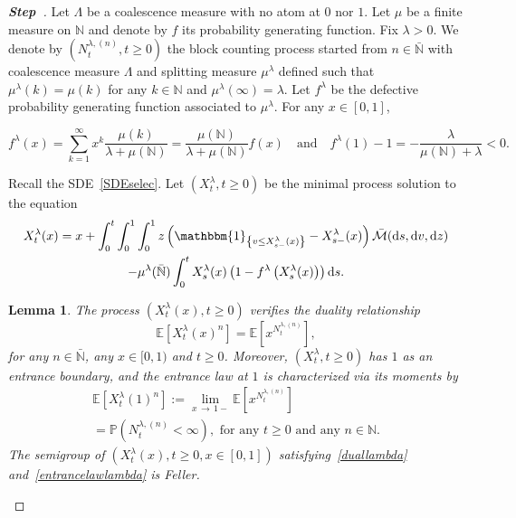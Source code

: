 \documentclass[10pt]{amsart}
\newtheorem{lemm}[theo]{Lemma}\newtheorem{prop}[theo]{Proposition}\newtheorem{coro}[theo]{Corollary}\newtheorem{conj}[theo]{Conjecture}
\theoremstyle{definition}\newtheorem{defi}[theo]{Definition}\newtheorem{rema}[theo]{Remark}\newtheorem{exam}[theo]{Example}\newtheorem{exem}[theo]{Example}\newtheorem{nota}[theo]{Notation}
\newcommand{\ddr}{\mathrm{d}}
\newcommand{\bbmun}{\mathbbm{1}}
\newcommand{\bbN}{\mathbb{N}}
\newcommand{\bbE}{\mathbb{E}}
\newcommand{\bbP}{\mathbb{P}}
\newcommand{\clM}{\mathcal{M}}
\newcounter{stepcount}
\newenvironment{step}{\refstepcounter{stepcount}\begin{proof}[\textbf{Step~\thestepcount}]}{\end{proof}}
\begin{document}
\begin{step}%
Let $\Lambda$ be a coalescence measure with no atom at $0$ nor $1$. Let $\mu$ be a finite measure on $\bbN$ and denote by $f$ its probability generating function. Fix $\lambda>0$. We denote by $(N_t^{\lambda,(n)},t\geq 0)$ the block counting process started from $n\in \bar{\bbN}$ with coalescence measure $\Lambda$ and splitting measure $\mu^{\lambda}$ defined such that $\mu^{\lambda}(k)=\mu(k)$ for any $k\in \bbN$ and $\mu^{\lambda}(\infty)=\lambda$. Let $f^{\lambda}$ be the defective probability generating function associated to $\mu^{\lambda}$. For any $x\in [0,1]$, 

\[
f^{\lambda}(x)=\sum_{k=1}^{\infty}x^{k}\frac{\mu(k)}{\lambda+\mu(\bbN)}=\frac{\mu(\bbN)}{\lambda+\mu(\bbN)}f(x)\quad\text{and}\quad f^{\lambda}(1)-1=-\frac{\lambda}{\mu(\bbN)+\lambda}<0.
\]

Recall the SDE~\eqref{SDEselec}. Let $(X^{\lambda}_t,t\geq 0)$ be the minimal process solution to the equation
\begin{multline}\label{sdelambda}
X^{\lambda}_t(x)=x+\int_{0}^{t}\int_{0}^{1}\int_{0}^{1}z\left(\bbmun_{\left\{v\leq X^{\lambda}_{s-}(x)\right\}}-X^{\lambda}_{s-}(x)\right)\bar{\clM}(\ddr s,\ddr v, \ddr z)\\
-\mu^{\lambda}(\bar{\bbN})\int_{0}^{t}X^{\lambda}_{s}(x)\left(1-f^{\lambda}\left(X^{\lambda}_{s}(x)\right)\right)\ddr s.
\end{multline}

\begin{lemm}\label{recextenslambda}
The process $(X_t^{\lambda}(x),t\geq 0)$ verifies the duality relationship
\begin{equation}\label{duallambda}
\bbE\left[X^{\lambda}_t(x)^n\right]=\bbE\left[x^{N_t^{\lambda,(n)}}\right],
\end{equation}
for any $n\in \bar{\bbN}$, any $x\in [0,1)$ and $t\geq 0$. Moreover, $(X_t^{\lambda},t\geq 0)$ has $1$ as an entrance boundary, and the entrance law at $1$ is characterized via its moments by
\begin{multline}\label{entrancelawlambda}
\bbE\left[X^{\lambda}_t(1)^n\right]:=\underset{x\,\rightarrow\,1-}{\lim} \bbE\left[x^{N_t^{\lambda,(n)}}\right]\\
=\bbP\left(N_t^{\lambda,(n)}<\infty\right),\text{ for any } t\geq 0 \text{ and any } n\in \bbN.
\end{multline}
The semigroup of $(X_t^{\lambda}(x),t\geq 0, x\in [0,1])$ satisfying~\eqref{duallambda} and~\eqref{entrancelawlambda} is Feller.
\end{lemm}


\end{step}
\end{document}
